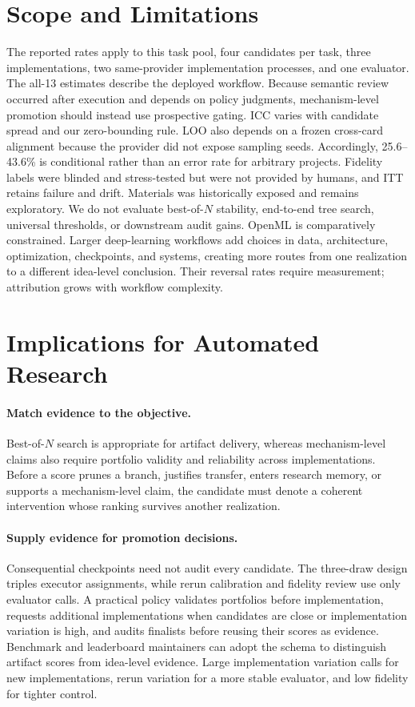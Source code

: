 \documentclass[letterpaper]{article}
\begin{document}
\section{Scope and Limitations}

The reported rates apply to this task pool, four candidates per task, three implementations, two same-provider implementation processes, and one evaluator. The all-13 estimates describe the deployed workflow. Because semantic review occurred after execution and depends on policy judgments, mechanism-level promotion should instead use prospective gating. ICC varies with candidate spread and our zero-bounding rule. LOO also depends on a frozen cross-card alignment because the provider did not expose sampling seeds. Accordingly, 25.6--43.6\% is conditional rather than an error rate for arbitrary projects. Fidelity labels were blinded and stress-tested but were not provided by humans, and ITT retains failure and drift. Materials was historically exposed and remains exploratory. We do not evaluate best-of-$N$ stability, end-to-end tree search, universal thresholds, or downstream audit gains. OpenML is comparatively constrained. Larger deep-learning workflows add choices in data, architecture, optimization, checkpoints, and systems, creating more routes from one realization to a different idea-level conclusion. Their reversal rates require measurement; attribution grows with workflow complexity.

\section{Implications for Automated Research}
\label{sec:implications}

\paragraph{Match evidence to the objective.} Best-of-$N$ search is appropriate for artifact delivery, whereas mechanism-level claims also require portfolio validity and reliability across implementations. Before a score prunes a branch, justifies transfer, enters research memory, or supports a mechanism-level claim, the candidate must denote a coherent intervention whose ranking survives another realization.

\paragraph{Supply evidence for promotion decisions.} Consequential checkpoints need not audit every candidate. The three-draw design triples executor assignments, while rerun calibration and fidelity review use only evaluator calls. A practical policy validates portfolios before implementation, requests additional implementations when candidates are close or implementation variation is high, and audits finalists before reusing their scores as evidence. Benchmark and leaderboard maintainers can adopt the schema to distinguish artifact scores from idea-level evidence. Large implementation variation calls for new implementations, rerun variation for a more stable evaluator, and low fidelity for tighter control.
\end{document}
